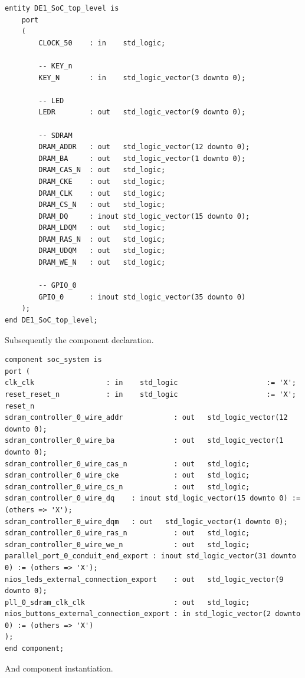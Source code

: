 \begin{verbatim}
entity DE1_SoC_top_level is
    port
    (
        CLOCK_50    : in    std_logic;
        
        -- KEY_n
        KEY_N       : in    std_logic_vector(3 downto 0);
        
        -- LED
        LEDR        : out   std_logic_vector(9 downto 0);
        
        -- SDRAM
        DRAM_ADDR   : out   std_logic_vector(12 downto 0);
        DRAM_BA     : out   std_logic_vector(1 downto 0);
        DRAM_CAS_N  : out   std_logic;
        DRAM_CKE    : out   std_logic;
        DRAM_CLK    : out   std_logic;
        DRAM_CS_N   : out   std_logic;
        DRAM_DQ     : inout std_logic_vector(15 downto 0);
        DRAM_LDQM   : out   std_logic;
        DRAM_RAS_N  : out   std_logic;
        DRAM_UDQM   : out   std_logic;
        DRAM_WE_N   : out   std_logic;
        
        -- GPIO_0
        GPIO_0      : inout std_logic_vector(35 downto 0)
    );
end DE1_SoC_top_level;
\end{verbatim}
Subsequently the component declaration.
\begin{verbatim}
component soc_system is
port (
clk_clk                 : in    std_logic                     := 'X';
reset_reset_n           : in    std_logic                     := 'X';
reset_n
sdram_controller_0_wire_addr            : out   std_logic_vector(12 downto 0);                    
sdram_controller_0_wire_ba              : out   std_logic_vector(1 downto 0);                     
sdram_controller_0_wire_cas_n           : out   std_logic;
sdram_controller_0_wire_cke             : out   std_logic;
sdram_controller_0_wire_cs_n            : out   std_logic;
sdram_controller_0_wire_dq    : inout std_logic_vector(15 downto 0) := (others => 'X');
sdram_controller_0_wire_dqm   : out   std_logic_vector(1 downto 0);
sdram_controller_0_wire_ras_n           : out   std_logic;
sdram_controller_0_wire_we_n            : out   std_logic;
parallel_port_0_conduit_end_export : inout std_logic_vector(31 downto 0) := (others => 'X');
nios_leds_external_connection_export    : out   std_logic_vector(9 downto 0);
pll_0_sdram_clk_clk                     : out   std_logic;
nios_buttons_external_connection_export : in std_logic_vector(2 downto 0) := (others => 'X')
);
end component;
\end{verbatim}
And component instantiation.
